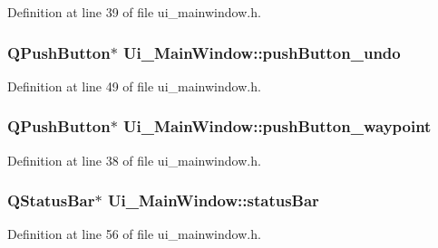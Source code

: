 Definition at line 39 of file ui\+\_\+mainwindow.\+h.

\subsubsection[{\texorpdfstring{push\+Button\+\_\+undo}{pushButton_undo}}]{\setlength{\rightskip}{0pt plus 5cm}Q\+Push\+Button$\ast$ Ui\+\_\+\+Main\+Window\+::push\+Button\+\_\+undo}\hypertarget{class_ui___main_window_ab3fd048b1a1dee328d8e1b433955bf29}{}\label{class_ui___main_window_ab3fd048b1a1dee328d8e1b433955bf29}


Definition at line 49 of file ui\+\_\+mainwindow.\+h.

\subsubsection[{\texorpdfstring{push\+Button\+\_\+waypoint}{pushButton_waypoint}}]{\setlength{\rightskip}{0pt plus 5cm}Q\+Push\+Button$\ast$ Ui\+\_\+\+Main\+Window\+::push\+Button\+\_\+waypoint}\hypertarget{class_ui___main_window_a6b5d7c0f96cdb3276a33746fbcd7e8c7}{}\label{class_ui___main_window_a6b5d7c0f96cdb3276a33746fbcd7e8c7}


Definition at line 38 of file ui\+\_\+mainwindow.\+h.

\subsubsection[{\texorpdfstring{status\+Bar}{statusBar}}]{\setlength{\rightskip}{0pt plus 5cm}Q\+Status\+Bar$\ast$ Ui\+\_\+\+Main\+Window\+::status\+Bar}\hypertarget{class_ui___main_window_a50fa481337604bcc8bf68de18ab16ecd}{}\label{class_ui___main_window_a50fa481337604bcc8bf68de18ab16ecd}


Definition at line 56 of file ui\+\_\+mainwindow.\+h.

